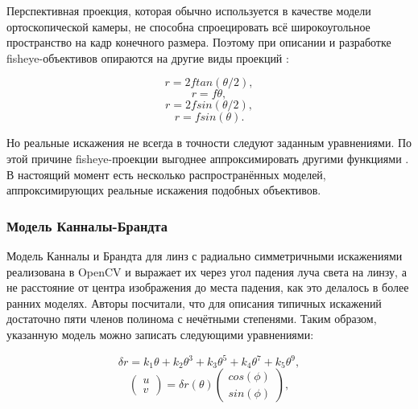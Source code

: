 Перспективная проекция, которая обычно используется в качестве модели ортоскопической камеры, не способна спроецировать всё широкоугольное пространство на кадр 
конечного размера. Поэтому при описании и разработке fisheye-объективов опираются на другие виды проекций  \cite{projections}:

\begin{eqseries}
    \begin{equation}
        \label{fy1}
    r = 2 f tan(\theta/2),  
    \end{equation}
    \begin{equation}
        \label{fy2}
    r = f \theta,
    \end{equation}
    \begin{equation}
        \label{fy3}
    r = 2 f sin(\theta/2),
    \end{equation}
    \begin{equation}
        \label{fy4}
    r = f sin(\theta).
    \end{equation}
\end{eqseries}    

Но реальные искажения не всегда в точности следуют заданным уравнениями.
По этой причине fisheye-проекции выгоднее аппроксимировать другими функциями \cite{opencv_model}.
В настоящий момент есть несколько распространённых моделей, аппроксимирующих реальные искажения подобных объективов. 

\subsubsection{Модель Канналы-Брандта}

Модель Канналы и Брандта \cite{opencv_model} для линз с радиально симметричными искажениями реализована в OpenCV и 
выражает их через угол падения луча света на линзу, а не расстояние                                                              
от центра изображения до места падения, как это делалось в более ранних моделях. Авторы посчитали, что для описания типичных искажений достаточно 
пяти членов полинома с нечётными степенями. Таким образом, указанную модель можно записать следующими уравнениями:
\begin{eqseries}
    \begin{equation}	
        \delta r = k_1\theta + k_2\theta^3 + k_3\theta^5 + k_4\theta^7 + k_5\theta^9,
        \label{eqn:kannala_r}
    \end{equation}
    \begin{equation}	
        \begin{pmatrix}u\\v\end{pmatrix} = \delta r(\theta)\begin{pmatrix}cos(\phi)\\sin(\phi)\end{pmatrix},
        \label{eqn:kannala_uv}
    \end{equation}
\end{eqseries}

